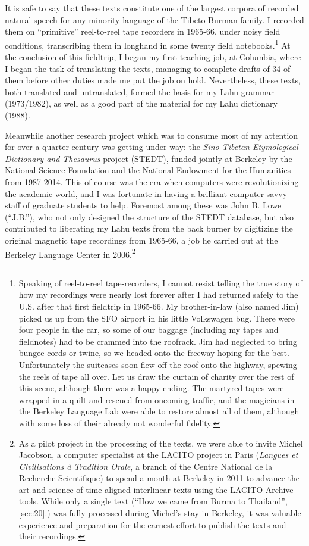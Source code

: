 It is safe to say that these texts constitute one of the largest corpora
of recorded natural speech for any minority language of the
Tibeto-Burman family. I recorded them on ``primitive'' reel-to-reel tape
recorders in 1965-66, under noisy field conditions, transcribing them in
longhand in some twenty field notebooks.\footnote{Speaking of
  reel-to-reel tape-recorders, I cannot resist telling the true story of
  how my recordings were nearly lost forever after I had returned safely
  to the U.S. after that first fieldtrip in 1965-66. My brother-in-law
  (also named Jim) picked us up from the SFO airport in his little
  Volkswagen bug. There were four people in the car, so some of our
  baggage (including my tapes and fieldnotes) had to be crammed into the
  roofrack. Jim had neglected to bring bungee cords or twine, so we
  headed onto the freeway hoping for the best. Unfortunately the
  suitcases soon flew off the roof onto the highway, spewing the reels
  of tape all over. Let us draw the curtain of charity over the rest of
  this scene, although there was a happy ending. The martyred tapes were
  wrapped in a quilt and rescued from oncoming traffic, and the
  magicians in the Berkeley Language Lab were able to restore almost all
  of them, although with some loss of their already not wonderful
  fidelity.} At the conclusion of this fieldtrip, I began my first
teaching job, at Columbia, where I began the task of translating the
texts, managing to complete drafts of 34 of them before other duties
made me put the job on hold. Nevertheless, these texts, both translated
and untranslated, formed the basis for my Lahu grammar (1973/1982), as
well as a good part of the material for my Lahu dictionary (1988).

Meanwhile another research project which was to consume most of my
attention for over a quarter century was getting under way: the
\emph{Sino-Tibetan Etymological Dictionary and Thesaurus} project
(STEDT), funded jointly at Berkeley by the National Science Foundation
and the National Endowment for the Humanities from 1987-2014. This of
course was the era when computers were revolutionizing the academic
world, and I was fortunate in having a brilliant computer-savvy staff
of graduate students to help. Foremost among these was John B. Lowe
(``J.B.''), who not only designed the structure of the STEDT database,
but also contributed to liberating my Lahu texts from the back burner
by digitizing the original magnetic tape recordings from 1965-66, a
job he carried out at the Berkeley Language Center in
2006.\footnote{As a pilot project in the processing of the texts, we
  were able to invite Michel Jacobson, a computer specialist at the
  LACITO project in Paris (\emph{Langues et Civilisations à Tradition
    Orale}, a branch of the Centre National de la Recherche
  Scientifique) to spend a month at Berkeley in 2011
  to advance the art and science of time-aligned interlinear texts using the LACITO Archive
  tools. While only a single text (``How we came from
  Burma to Thailand'', \ref{sec:20}.) was fully processed during Michel's
  stay in Berkeley, it was valuable experience and preparation for the earnest
  effort to publish the texts and their recordings.}

